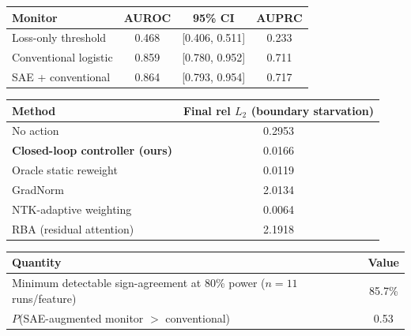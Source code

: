 \begin{tabular}{lccc}
\toprule
Monitor & AUROC & 95\% CI & AUPRC \\
\midrule
Loss-only threshold & 0.468 & [0.406, 0.511] & 0.233 \\
Conventional logistic & 0.859 & [0.780, 0.952] & 0.711 \\
SAE + conventional & 0.864 & [0.793, 0.954] & 0.717 \\
\bottomrule
\end{tabular}

\begin{tabular}{lc}
\toprule
Method & Final rel $L_2$ (boundary starvation) \\
\midrule
No action & 0.2953 \\
\textbf{Closed-loop controller (ours)} & 0.0166 \\
Oracle static reweight & 0.0119 \\
GradNorm & 2.0134 \\
NTK-adaptive weighting & 0.0064 \\
RBA (residual attention) & 2.1918 \\
\bottomrule
\end{tabular}

\begin{tabular}{lc}
\toprule
Quantity & Value \\
\midrule
Minimum detectable sign-agreement at 80\% power ($n=11$ runs/feature) & 85.7\% \\
$P$(SAE-augmented monitor $>$ conventional) & 0.53 \\
\bottomrule
\end{tabular}
